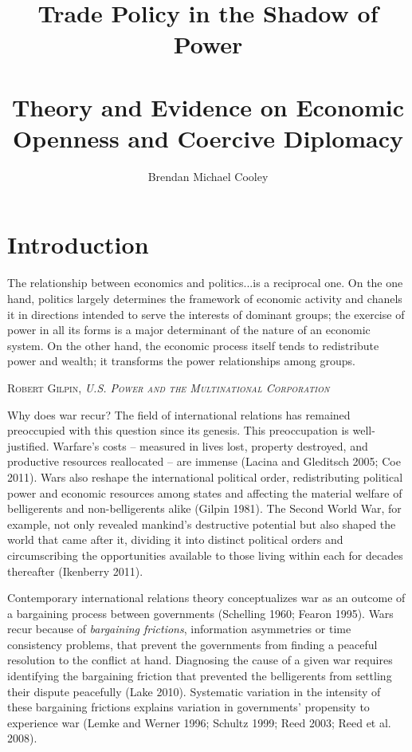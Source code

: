 \documentclass{puthesis}
\title{Trade Policy in the Shadow of Power\\
\tiny \hfill\\
\Large Theory and Evidence on Economic Openness and Coercive Diplomacy}
\author{Brendan Michael Cooley}
\let\originalepigraph\epigraph
\renewcommand\epigraph[2]{\originalepigraph{#1}{\textsc{#2}}}
\begin{document}

\chapter*{Introduction}

\epigraph{The relationship between economics and politics...is a reciprocal one. On the one hand, politics largely determines the framework of economic activity and chanels it in directions intended to serve the interests of dominant groups; the exercise of power in all its forms is a major determinant of the nature of an economic system. On the other hand, the economic process itself tends to redistribute power and wealth; it transforms the power relationships among groups.}{Robert Gilpin, \textit{U.S. Power and the Multinational Corporation}}

Why does war recur? The field of international relations has remained
preoccupied with this question since its genesis. This preoccupation is
well-justified. Warfare's costs -- measured in lives lost, property
destroyed, and productive resources reallocated -- are immense (Lacina
and Gleditsch 2005; Coe 2011). Wars also reshape the international
political order, redistributing political power and economic resources
among states and affecting the material welfare of belligerents and
non-belligerents alike (Gilpin 1981). The Second World War, for example,
not only revealed mankind's destructive potential but also shaped the
world that came after it, dividing it into distinct political orders and
circumscribing the opportunities available to those living within each
for decades thereafter (Ikenberry 2011).

Contemporary international relations theory conceptualizes war as an
outcome of a bargaining process between governments (Schelling 1960;
Fearon 1995). Wars recur because of \emph{bargaining frictions},
information asymmetries or time consistency problems, that prevent the
governments from finding a peaceful resolution to the conflict at hand.
Diagnosing the cause of a given war requires identifying the bargaining
friction that prevented the belligerents from settling their dispute
peacefully (Lake 2010). Systematic variation in the intensity of these
bargaining frictions explains variation in governments' propensity to
experience war (Lemke and Werner 1996; Schultz 1999; Reed 2003; Reed et
al. 2008).
\end{document}
